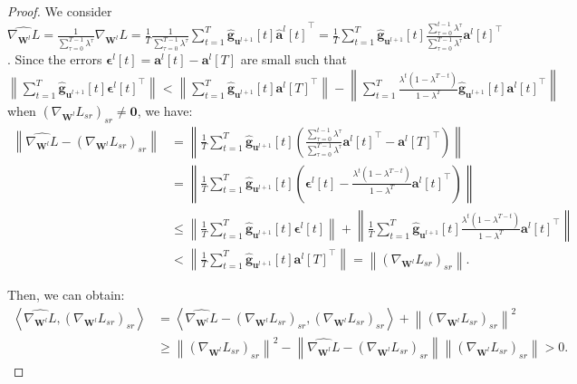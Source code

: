 \documentclass{article}
\begin{document}
\begin{proof}
We consider $\widehat{\nabla_{\mathbf{W}^l}L} = \frac{1}{\sum_{\tau=0}^{T-1}\lambda^\tau}\nabla_{\mathbf{W}^l}L = \frac{1}{T}\frac{1}{\sum_{\tau=0}^{T-1}\lambda^\tau} \sum_{t=1}^T \hat{\mathbf{g}}_{\mathbf{u}^{l+1}}[t] {\hat{\mathbf{a}}^l[t]}^\top=\frac{1}{T}\sum_{t=1}^T \hat{\mathbf{g}}_{\mathbf{u}^{l+1}}[t] \frac{\sum_{\tau=0}^{t-1}\lambda^\tau}{\sum_{\tau=0}^{T-1}\lambda^\tau}{\mathbf{a}^l[t]}^\top$. Since the errors $\bm{\epsilon}^l[t]=\mathbf{a}^l[t]-\mathbf{a}^l[T]$ are small such that $\left\lVert \sum_{t=1}^T \hat{\mathbf{g}}_{\mathbf{u}^{l+1}}[t] {\bm{\epsilon}^l[t]}^\top \right\rVert < \left\lVert \sum_{t=1}^T \hat{\mathbf{g}}_{\mathbf{u}^{l+1}}[t] {\mathbf{a}^l[T]}^\top \right\rVert - \left\lVert \sum_{t=1}^T \frac{\lambda^t(1-\lambda^{T-t})}{1-\lambda^T}\hat{\mathbf{g}}_{\mathbf{u}^{l+1}}[t] {\mathbf{a}^l[t]}^\top \right\rVert$ when $\left(\nabla_{\mathbf{W}^l}L_{sr}\right)_{sr}\neq\mathbf{0}$, we have:
\begin{equation}
\begin{aligned}
    \left\lVert \widehat{\nabla_{\mathbf{W}^l}L}-\left(\nabla_{\mathbf{W}^l}L_{sr}\right)_{sr} \right\rVert &= \left\lVert \frac{1}{T}\sum_{t=1}^T \hat{\mathbf{g}}_{\mathbf{u}^{l+1}}[t] \left(\frac{\sum_{\tau=0}^{t-1}\lambda^\tau}{\sum_{\tau=0}^{T-1}\lambda^\tau}{\mathbf{a}^l[t]}^\top - {\mathbf{a}^l[T]}^\top\right) \right\rVert\\
    &= \left\lVert \frac{1}{T}\sum_{t=1}^T \hat{\mathbf{g}}_{\mathbf{u}^{l+1}}[t] \left(\bm{\epsilon}^l[t] - \frac{\lambda^t(1-\lambda^{T-t})}{1-\lambda^T}{\mathbf{a}^l[t]}^\top\right) \right\rVert\\
    &\leq \left\lVert \frac{1}{T}\sum_{t=1}^T \hat{\mathbf{g}}_{\mathbf{u}^{l+1}}[t] \bm{\epsilon}^l[t] \right\rVert + \left\lVert \frac{1}{T}\sum_{t=1}^T \hat{\mathbf{g}}_{\mathbf{u}^{l+1}}[t]\frac{\lambda^t(1-\lambda^{T-t})}{1-\lambda^T}{\mathbf{a}^l[t]}^\top \right\rVert\\
    &< \left\lVert \frac{1}{T}\sum_{t=1}^T \hat{\mathbf{g}}_{\mathbf{u}^{l+1}}[t] {\mathbf{a}^l[T]}^\top \right\rVert = \left\lVert \left(\nabla_{\mathbf{W}^l}L_{sr}\right)_{sr} \right\rVert.
\end{aligned}
\end{equation}

Then, we can obtain:
\begin{equation}
\begin{aligned}
    \left<\widehat{\nabla_{\mathbf{W}^l}L}, \left(\nabla_{\mathbf{W}^l}L_{sr}\right)_{sr}\right> &= \left<\widehat{\nabla_{\mathbf{W}^l}L}-\left(\nabla_{\mathbf{W}^l}L_{sr}\right)_{sr}, \left(\nabla_{\mathbf{W}^l}L_{sr}\right)_{sr}\right> + \left\lVert \left(\nabla_{\mathbf{W}^l}L_{sr}\right)_{sr} \right\rVert^2\\
    & \geq \left\lVert \left(\nabla_{\mathbf{W}^l}L_{sr}\right)_{sr} \right\rVert^2 - \left\lVert \widehat{\nabla_{\mathbf{W}^l}L}-\left(\nabla_{\mathbf{W}^l}L_{sr}\right)_{sr} \right\rVert \left\lVert \left(\nabla_{\mathbf{W}^l}L_{sr}\right)_{sr} \right\rVert > 0.
\end{aligned}
\end{equation}


\end{proof}
\end{document}
